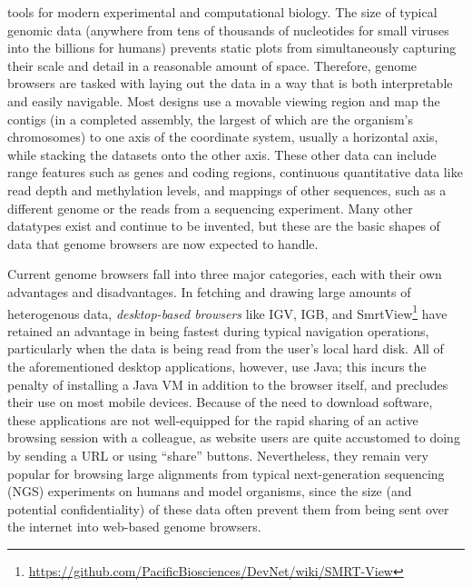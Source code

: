 tools for modern experimental and computational biology. The size of typical genomic data (anywhere from tens of thousands of nucleotides for small viruses into the billions for humans) prevents static plots from simultaneously capturing their scale and detail in a reasonable amount of space. Therefore, genome browsers are tasked with laying out the data in a way that is both interpretable and easily navigable. Most designs use a movable viewing region and map the contigs (in a completed assembly, the largest of which are the organism's chromosomes) to one axis of the coordinate system, usually a horizontal axis, while stacking the datasets onto the other axis. These other data can include range features such as genes and coding regions, continuous quantitative data like read depth and methylation levels, and mappings of other sequences, such as a different genome or the reads from a sequencing experiment. Many other datatypes exist and continue to be invented, but these are the basic shapes of data that genome browsers are now expected to handle.

Current genome browsers fall into three major categories, each with their own advantages and disadvantages. In fetching and drawing large amounts of heterogenous data, \emph{desktop-based browsers} like IGV,\autocite{Thorvaldsdottir2013} IGB,\autocite{Freese2016} and SmrtView\footnote{\url{https://github.com/PacificBiosciences/DevNet/wiki/SMRT-View}} have retained an advantage in being fastest during typical navigation operations, particularly when the data is being read from the user's local hard disk. All of the aforementioned desktop applications, however, use Java; this incurs the penalty of installing a Java VM in addition to the browser itself, and precludes their use on most mobile devices. Because of the need to download software, these applications are not well-equipped for the rapid sharing of an active browsing session with a colleague, as website users are quite accustomed to doing by sending a URL or using ``share'' buttons. Nevertheless, they remain very popular for browsing large alignments from typical next-generation sequencing (NGS) experiments on humans and model organisms, since the size (and potential confidentiality) of these data often prevent them from being sent over the internet into web-based genome browsers. 


